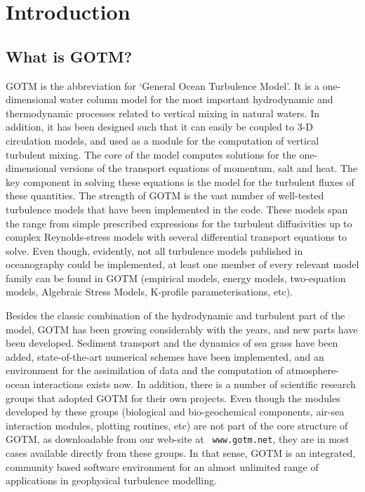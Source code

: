 %
%

\section{Introduction}

\subsection{What is GOTM?}
GOTM is the abbreviation for `General Ocean Turbulence Model'. It is a
one-dimensional water column model for the most important hydrodynamic
and thermodynamic processes related to vertical mixing in natural
waters. In addition, it has been designed such that it can easily be
coupled to 3-D circulation models, and used as a module for the
computation of vertical turbulent mixing. The core of the model
computes solutions for the one-dimensional versions of the transport
equations of momentum, salt and heat. The key component in solving
these equations is the model for the turbulent fluxes of these
quantities. The strength of GOTM is the vast number of well-tested
turbulence models that have been implemented in the code. These models
span the range from simple prescribed expressions for the turbulent
diffusivities up to complex Reynolds-stress models with several
differential transport equations to solve. Even though, evidently, not
all turbulence models published in oceanography could be implemented,
at least one member of every relevant model family can be found in
GOTM (empirical models, energy models, two-equation models, Algebraic
Stress Models, K-profile parameterisations, etc).

Besides the classic combination of the hydrodynamic and turbulent part
of the model, GOTM has been growing considerably with the years, and
new parts have been developed. Sediment transport and the dynamics of
sea grass have been added, state-of-the-art numerical schemes have
been implemented, and an environment for the assimilation of data and
the computation of atmosphere-ocean interactions exists now. In
addition, there is a number of scientific research groups that adopted
GOTM for their own projects. Even though the modules developed by
these groups (biological and bio-geochemical components, air-sea
interaction modules, plotting routines, etc) are not part of the core
structure of GOTM, as downloadable from our web-site at {\tt
www.gotm.net}, they are in most cases available directly from these
groups. In that sense, GOTM is an integrated, community based software
environment for an almost unlimited range of applications in
geophysical turbulence modelling.



